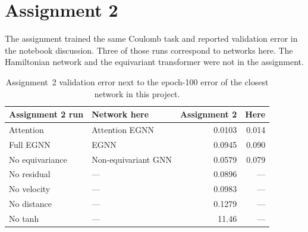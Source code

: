 \documentclass[11pt]{article}
\begin{document}
\section{Assignment 2}

The assignment trained the same Coulomb task and reported validation error in the notebook discussion.
Three of those runs correspond to networks here.
The Hamiltonian network and the equivariant transformer were not in the assignment.

\begin{table}[ht]
\centering
\caption{Assignment~2 validation error next to the epoch-100 error of the closest network in this project.}
\label{tab:a2}
\begin{tabular}{llrr}
\toprule
Assignment 2 run & Network here & Assignment 2 & Here \\
\midrule
Attention & Attention EGNN & 0.0103 & 0.014 \\
Full EGNN & EGNN & 0.0945 & 0.090 \\
No equivariance & Non-equivariant GNN & 0.0579 & 0.079 \\
No residual & --- & 0.0896 & --- \\
No velocity & --- & 0.0983 & --- \\
No distance & --- & 0.1279 & --- \\
No tanh & --- & 11.46 & --- \\
\bottomrule
\end{tabular}
\end{table}
\end{document}
